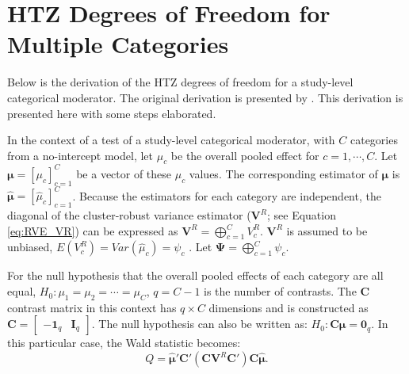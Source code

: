 
\chapter{HTZ Degrees of Freedom for Multiple Categories}\label{App: multiplecat}
\def\Pr{{\text{Pr}}}
\def\E{{\text{E}}}
\def\Var{{\text{Var}}}
\def\Cov{{\text{Cov}}}
\def\cor{{\text{cor}}}
\def\bm{\mathbf}
\def\bs{\boldsymbol}



Below is the derivation of the HTZ degrees of freedom for a study-level categorical moderator. The original derivation is presented by \textcite{pustejovsky2024}. This derivation is presented here with some steps elaborated. 

In the context of a test of a study-level categorical moderator, with $C$ categories from a no-intercept model, let $\mu_c$ be the overall pooled effect for $c=1,\cdots, C$. Let $\bm{\mu} = \left[\mu_c\right]_{c=1}^C$ be a vector of these $\mu_c$ values. The corresponding estimator of $\bm{\mu}$  is $\bm{\hat{\mu}} = \left[\hat{\mu}_c\right]_{c=1}^C$. Because the estimators for each category are independent, the diagonal of the cluster-robust variance estimator ($\bm{V}^R$; see Equation \ref{eq:RVE_VR}) can be expressed as $\bm{V}^R = \bigoplus_{c=1}^C V^R_c$.
$\bm{V}^R$ is assumed to be unbiased, $E(V_c^R) = Var(\hat{\mu}_c) = \psi_c$ \autocite{pustejovsky_wald_2025}. Let $\bs{\Psi} = \bigoplus_{c=1}^C \psi_c$.



For the null hypothesis that the overall pooled effects of each category are all equal,  $H_0: \mu_1 = \mu_2 = \cdots = \mu_C$,  $q=C-1$ is the number of contrasts. The $\mathbf{C}$ contrast matrix in this context has $q \times C$ dimensions and is constructed as $\mathbf{C} = \begin{bmatrix}
    -\mathbf{1}_q & \mathbf{I}_q
\end{bmatrix}$.  The null hypothesis can also be written as: $H_0:\mathbf{C}\bm{\mu} = \bm{0}_q$. In this particular case, the Wald statistic becomes:
\begin{equation}
    Q = \hat{\bm{\mu}}'\mathbf{C}'(\mathbf{C} \mathbf{V}^R \mathbf{C}') \mathbf{C}\hat{\bm{\mu}}.
    \nonumber
\end{equation}

